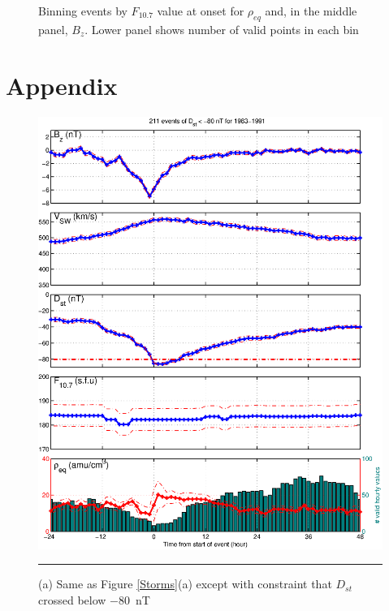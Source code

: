 \documentclass[10pt,twocolumn]{article}
\begin{document}
\begin{figure}[tp!]
\caption{Binning events by $F_{10.7}$ value at onset for $\rho_{eq}$ and, in the middle panel, $B_z$. Lower panel shows number of valid points in each bin}
\label{f107bin}
\end{figure}


\clearpage

\section{Appendix}
\hfill

\begin{figure}[htp!]
\centering
\includegraphics[scale=0.40]{paperfigures/stormavs-d80.eps}
\rule[1ex]{5cm}{1pt}
\caption{(a) Same as Figure \ref{Storms}(a) except with constraint that $D_{st}$ crossed below $-80$~nT }
\label{Dspec}
\end{figure}

\clearpage
\end{document}

